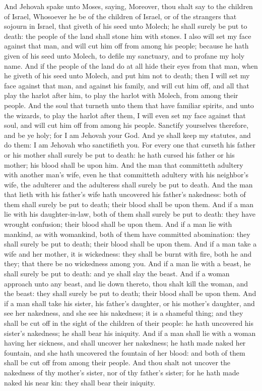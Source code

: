 And Jehovah spake unto Moses, saying, Moreover, thou shalt say to the children of Israel, Whosoever he be of the children of Israel, or of the strangers that sojourn in Israel, that giveth of his seed unto Molech; he shall surely be put to death: the people of the land shall stone him with stones. I also will set my face against that man, and will cut him off from among his people; because he hath given of his seed unto Molech, to defile my sanctuary, and to profane my holy name. And if the people of the land do at all hide their eyes from that man, when he giveth of his seed unto Molech, and put him not to death; then I will set my face against that man, and against his family, and will cut him off, and all that play the harlot after him, to play the harlot with Molech, from among their people.  And the soul that turneth unto them that have familiar spirits, and unto the wizards, to play the harlot after them, I will even set my face against that soul, and will cut him off from among his people. Sanctify yourselves therefore, and be ye holy; for I am Jehovah your God. And ye shall keep my statutes, and do them: I am Jehovah who sanctifieth you. For every one that curseth his father or his mother shall surely be put to death: he hath cursed his father or his mother; his blood shall be upon him.  And the man that committeth adultery with another man’s wife, even he that committeth adultery with his neighbor’s wife, the adulterer and the adulteress shall surely be put to death. And the man that lieth with his father’s wife hath uncovered his father’s nakedness: both of them shall surely be put to death; their blood shall be upon them. And if a man lie with his daughter-in-law, both of them shall surely be put to death: they have wrought confusion; their blood shall be upon them. And if a man lie with mankind, as with womankind, both of them have committed abomination: they shall surely be put to death; their blood shall be upon them. And if a man take a wife and her mother, it is wickedness: they shall be burnt with fire, both he and they; that there be no wickedness among you. And if a man lie with a beast, he shall surely be put to death: and ye shall slay the beast. And if a woman approach unto any beast, and lie down thereto, thou shalt kill the woman, and the beast: they shall surely be put to death; their blood shall be upon them.  And if a man shall take his sister, his father’s daughter, or his mother’s daughter, and see her nakedness, and she see his nakedness; it is a shameful thing; and they shall be cut off in the sight of the children of their people: he hath uncovered his sister’s nakedness; he shall bear his iniquity. And if a man shall lie with a woman having her sickness, and shall uncover her nakedness; he hath made naked her fountain, and she hath uncovered the fountain of her blood: and both of them shall be cut off from among their people. And thou shalt not uncover the nakedness of thy mother’s sister, nor of thy father’s sister; for he hath made naked his near kin: they shall bear their iniquity. 